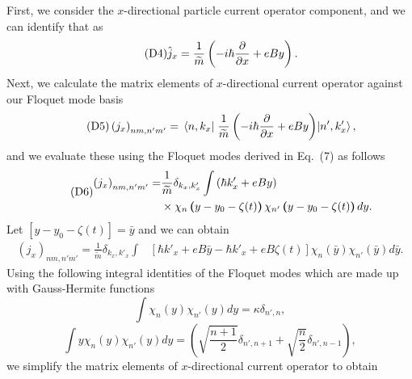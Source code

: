 \documentclass{article}
\begin{document}
\begin{itemize}
{  First, we consider the $x$-directional particle current operator component, and we can identify that as
  \begin{equation} \tag{D4}
    \hat{j}_x = \frac{1}{\widetilde{m}} \left(-i\hbar\pdv{x} + eBy \right).
  \end{equation}
  Next, we calculate the matrix elements of $x$-directional current operator against our Floquet mode basis
  \begin{equation} \tag{D5}
    \left({j}_x \right)_{nm,n'm'} =
    \mel{n,k_x}{\;\frac{1}{\widetilde{m}} \left(-i\hbar\pdv{x} + eBy \right)}{n',k'_x},
  \end{equation}
  and we evaluate these using the Floquet modes derived in Eq.~(7) as follows
  \begin{equation} \tag{D6}
    \begin{aligned}
      \left({j}_x \right)_{nm,n'm'} = &
      \frac{1}{{\widetilde{m}}}
      \delta_{k_x,k'_x}
      \int
      \left(\hbar k'_x + eBy\right) \\
      & \times
       \chi_{n}\bm{\left(}y - y_0 - \zeta(t)\bm{\right)}
      \chi_{n'}\bm{\left(}y - y_0 - \zeta(t)\bm{\right)}
      dy.
    \end{aligned}
  \end{equation}
  Let $[y - y_0 - \zeta(t)] = \bar{y}$ and we can obtain
  \begin{equation} \tag{D7}
    \begin{aligned}
      \left({j}_x \right)_{nm,n'm'} =
      \frac{1}{{\widetilde{m}}}
      \delta_{k_x,k'_x}
      \int &
      \left[ \hbar k'_x + eB\bar{y} -\hbar k'_x + eB\zeta(t)\right]
      \chi_{n}(\bar{y})
      \chi_{n'}(\bar{y})
      d\bar{y}.
    \end{aligned}
  \end{equation}
  Using the following integral identities of the Floquet modes which are made up with Gauss-Hermite functions \cite{vedenyapin11,szego59}
  \begin{equation} \tag{D8}
    \int
    \chi_{n}({y})
    \chi_{n'}({y}) d{y} =
    \kappa\delta_{n',n},
  \end{equation}
  \begin{equation} \tag{D9}
    \int
    y \chi_{n}({y})\chi_{n'}({y}) d{y} =
    \left(\sqrt{\frac{n+1}{2}} \delta_{n',n+1} + \sqrt{\frac{n}{2}}
    \delta_{n',n-1} \right),
  \end{equation}
  we simplify the matrix elements of $x$-directional current operator to obtain
  \begin{equation} \tag{D10}

\end{equation}}
\end{itemize}
\end{document}
